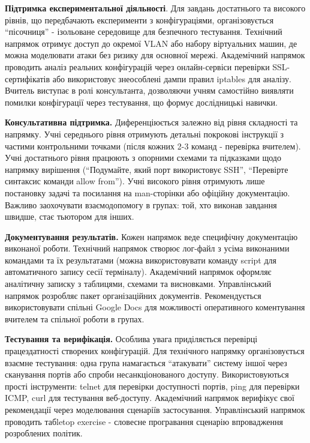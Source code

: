 \textbf{Підтримка експериментальної діяльності}. Для завдань достатнього та високого рівнів, що передбачають експерименти з конфігураціями, організовується ``пісочниця'' - ізольоване середовище для безпечного тестування. Технічний напрямок отримує доступ до окремої VLAN або набору віртуальних машин, де можна моделювати атаки без ризику для основної мережі. Академічний напрямок проводить аналіз реальних конфігурацій через онлайн-сервіси перевірки SSL-сертифікатів або використовує знеособлені дампи правил iptables для аналізу. Вчитель виступає в ролі консультанта, дозволяючи учням самостійно виявляти помилки конфігурації через тестування, що формує дослідницькі навички.

\textbf{Консультативна підтримка. }Диференціюється залежно від рівня складності та напрямку. Учні середнього рівня отримують детальні покрокові інструкції з частими контрольними точками (після кожних 2-3 команд - перевірка вчителем). Учні достатнього рівня працюють з опорними схемами та підказками щодо напрямку вирішення (``Подумайте, який порт використовує SSH'', ``Перевірте синтаксис команди allow from''). Учні високого рівня отримують лише постановку задачі та посилання на man-сторінки або офіційну документацію. Важливо заохочувати взаємодопомогу в групах: той, хто виконав завдання швидше, стає тьютором для інших.

\textbf{Документування результатів. }Кожен напрямок веде специфічну документацію виконаної роботи. Технічний напрямок створює лог-файл з усіма виконаними командами та їх результатами (можна використовувати команду script для автоматичного запису сесії терміналу). Академічний напрямок оформляє аналітичну записку з таблицями, схемами та висновками. Управлінський напрямок розробляє пакет організаційних документів. Рекомендується використовувати спільні Google Docs для можливості оперативного коментування вчителем та спільної роботи в групах.

\textbf{Тестування та верифікація.} Особлива увага приділяється перевірці працездатності створених конфігурацій. Для технічного напрямку організовується взаємне тестування: одна група намагається ``атакувати'' систему іншої через сканування портів або спроби несанкціонованого доступу. Використовуються прості інструменти: telnet для перевірки доступності портів, ping для перевірки ICMP, curl для тестування веб-доступу. Академічний напрямок верифікує свої рекомендації через моделювання сценаріїв застосування. Управлінський напрямок проводить табletop exercise - словесне програвання сценарію впровадження розроблених політик.

